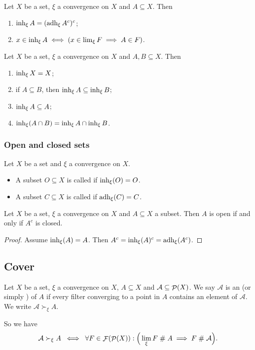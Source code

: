 \begin{lemma}
Let $X$ be a set, $\xi$ a convergence on $X$ and $A \subseteq X$. Then
\begin{enumerate}
\item $\operatorname{inh}_\xi A = (\operatorname{adh}_\xi A^c)^c$;
\item $x\in \operatorname{inh}_\xi A \iff (x\in \lim_\xi F \implies A\in F)$.
\end{enumerate}
\end{lemma}

\begin{proposition}
Let $X$ be a set, $\xi$ a convergence on $X$ and $A,B \subseteq X$. Then
\begin{enumerate}
\item $\operatorname{inh}_\xi X = X$;
\item if $A \subseteq B$, then $\operatorname{inh}_\xi A \subseteq \operatorname{inh}_\xi B$;
\item $\operatorname{inh}_\xi A\subseteq A$;
\item $\operatorname{inh}_\xi(A\cap B) = \operatorname{inh}_\xi A \cap \operatorname{inh}_\xi B$.
\end{enumerate}
\end{proposition}

\subsubsection{Open and closed sets}
\begin{definition}
Let $X$ be a set and $\xi$ a convergence on $X$.
\begin{itemize}
    \item A subset $O \subseteq X$ is called  if $\operatorname{inh}_\xi(O) = O$.
    \item A subset $C \subseteq X$ is called  if $\operatorname{adh}_\xi(C) = C$.
\end{itemize}
\end{definition}

\begin{lemma}
Let $X$ be a set, $\xi$ a convergence on $X$ and $A\subseteq X$ a subset. Then $A$ is open \textup{if and only if} $A^c$ is closed.
\end{lemma}
\begin{proof}
Assume $\operatorname{inh}_\xi(A) = A$. Then $A^c = \operatorname{inh}_\xi(A)^c = \operatorname{adh}_\xi(A^c)$.
\end{proof}

\subsection{Cover}
\begin{definition}
Let $X$ be a set, $\xi$ a convergence on $X$, $A\subseteq X$ and $\mathcal{A}\subseteq \mathop{\mathcal{P}}(X)$.
We say $\mathcal{A}$ is an  (or simply ) of $A$ if every filter converging to a point in $A$ contains an element of $\mathcal{A}$. We write $\mathcal{A} \succ_\xi A$.
\end{definition}
So we have
\[ \mathcal{A} \succ_\xi A \;\iff\; \forall F\in \mathop{\mathcal{F}}(\mathop{\mathcal{P}}(X)): \Big( \lim_\xi F \mathrel{\#} A \implies F \mathrel{\#} \mathcal{A} \Big). \]

